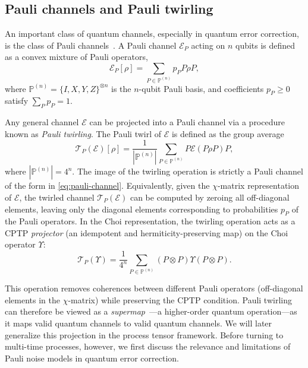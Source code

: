 \documentclass[
    aps,
    prx,
    reprint,
    superscriptaddress,
    longbibliography,
    nofootinbib,
    floatfix,
]{revtex4-2}
\begin{document}
\subsection{Pauli channels and Pauli twirling}
An important class of quantum channels, especially in quantum error correction, is the class of Pauli channels~\cite{nielsenQuantumComputationQuantum2010}. A Pauli channel \(\mathcal{E}_P\) acting on \(n\) qubits is defined as a convex mixture of Pauli operators,
\begin{equation}\label{eq:pauli-channel}
    \mathcal{E}_P[\rho] = \sum_{P \in \mathbb{P}^{(n)}} p_P P \rho P,
\end{equation}
where \(\mathbb{P}^{(n)} = \{I, X, Y, Z\}^{\otimes n}\) is the \(n\)-qubit Pauli basis, and coefficients \(p_P \geq 0\) satisfy \(\sum_{P} p_P = 1\). 

Any general channel \(\mathcal{E}\) can be projected into a Pauli channel via a procedure known as \emph{Pauli twirling}. The Pauli twirl of \(\mathcal{E}\) is defined as the group average
\begin{equation}\label{eq:pauli-twirl}
    \mathcal{T}_P(\mathcal{E})[\rho] = \frac{1}{|\mathbb{P}^{(n)}|} \sum_{P \in \mathbb{P}^{(n)}} P \mathcal{E}(P \rho P) P,
\end{equation}
where \(|\mathbb{P}^{(n)}| = 4^n\). The image of the twirling operation is strictly a Pauli channel of the form in \cref{eq:pauli-channel}. Equivalently, given the \(\chi\)-matrix representation of \(\mathcal{E}\), the twirled channel \(\mathcal{T}_P(\mathcal{E})\) can be computed by zeroing all off-diagonal elements, leaving only the diagonal elements corresponding to probabilities \(p_P\) of the Pauli operators. In the Choi representation, the twirling operation acts as a CPTP \emph{projector} (an idempotent and hermiticity-preserving map) on the Choi operator \(\Upsilon\):
\begin{equation}
    \mathcal{T}_P(\Upsilon) = \frac{1}{4^n} \sum_{P \in \mathbb{P}^{(n)}} (P \otimes P) \Upsilon (P \otimes P).
\end{equation}

This operation removes coherences between different Pauli operators (off-diagonal elements in the \(\chi\)-matrix) while preserving the CPTP condition. Pauli twirling can therefore be viewed as a \emph{supermap}~\cite{chiribellaQuantumCircuitArchitecture2008}---a higher-order quantum operation---as it maps valid quantum channels to valid quantum channels. We will later generalize this projection in the process tensor framework. Before turning to multi-time processes, however, we first discuss the relevance and limitations of Pauli noise models in quantum error correction. 
\end{document}
